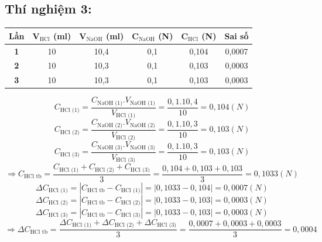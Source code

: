 \documentclass[12pt,a4paper]{report}
\begin{document}
\subsection*{Thí nghiệm 3:}
\begin{table}[h!]
\centering
    \begin{tabular}{|c|c|c|c|c|c|}
    \hline
    \textbf{Lần} & \textbf{V$_\text{HCl}$ (ml)} & \textbf{V$_\text{NaOH}$ (ml)} & \textbf{C$_\text{NaOH}$ (N)} & \textbf{C$_\text{HCl}$ (N)} & \textbf{Sai số} \\ \hline
    \textbf{1}   & 10                           & 10,4                          & 0,1                          & 0,104                       & 0,0007          \\ \hline
    \textbf{2}   & 10                           & 10,3                          & 0,1                          & 0,103                       & 0,0003          \\ \hline
    \textbf{3}   & 10                           & 10,3                          & 0,1                          & 0,103                       & 0,0003          \\ \hline
    \end{tabular}
    \end{table}
    \[
        C_\text{HCl (1)} = \frac{C_\text{NaOH (1)}.V_\text{NaOH (1)}}{V_\text{HCl (1)}} = \frac{0,1.10,4}{10} = 0,104 (N)
    \]
    \[
        C_\text{HCl (2)} = \frac{C_\text{NaOH (2)}.V_\text{NaOH (2)}}{V_\text{HCl (2)}} = \frac{0,1.10,3}{10} = 0,103 (N)
    \]
    \[
        C_\text{HCl (3)} = \frac{C_\text{NaOH (3)}.V_\text{NaOH (3)}}{V_\text{HCl (3)}} = \frac{0,1.10,3}{10} = 0,103 (N)
    \]
    \[
        \Rightarrow C_\text{HCl tb} = \frac{C_\text{HCl (1)}+C_\text{HCl (2)}+C_\text{HCl (3)}}{3} = \frac{0,104 + 0,103+0,103}{3} = 0,1033 (N)
    \]
    \[
        \Delta C_\text{HCl (1)} = |C_\text{HCl tb} - C_\text{HCl (1)}| = |0,1033 - 0,104| = 0,0007 (N)
    \]
    \[
        \Delta C_\text{HCl (2)} = |C_\text{HCl tb} - C_\text{HCl (2)}| = |0,1033 - 0,103| = 0,0003 (N)
    \]
    \[
        \Delta C_\text{HCl (3)} = |C_\text{HCl tb}- C_\text{HCl (3)}| = |0,1033 - 0,103| = 0,0003 (N)
    \]
    \[
        \Rightarrow \Delta C_\text{HCl tb} = \frac{\Delta C_\text{HCl (1)}+\Delta C_\text{HCl (2)}+\Delta C_\text{HCl (3)}}{3} = \frac{0,0007 +0,0003 + 0,0003}{3} = 0,0004
    \]
\end{document}
